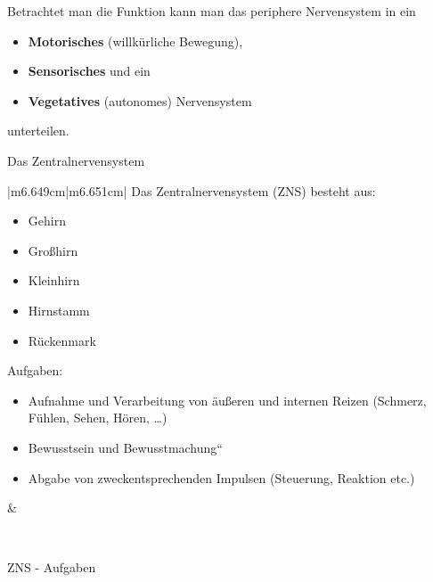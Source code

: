 \documentclass{article}
\newcommand\gEs[1]{\textbf{\textcolor[rgb]{0.0,0.0,0.5019608}{#1}}}
\newcommand\gEs[1]{\textbf{\textcolor[rgb]{0.0,0.0,0.5019608}{#1}}}
\newcommand\gNw[1]{#1}
\begin{document}
{\mdseries
Betrachtet man die Funktion kann man das periphere Nervensystem in ein }

\begin{itemize}
\item {\mdseries
\gEs{Motorisches} (willk\"urliche Bewegung),}

\item {\mdseries
\gEs{Sensorisches} und ein}

\item {\mdseries
\gEs{Vegetatives} (autonomes) Nervensystem}

\end{itemize}
{\mdseries
unterteilen. }

{\mdseries\color[rgb]{0.0,0.0,0.5019608}
Das Zentralnervensystem}

\begin{center}
\tablehead{}\begin{supertabular}{|m{6.649cm}|m{6.651cm}|}
\hline
Das Zentralnervensystem (ZNS) besteht aus:

\begin{itemize}
\item Gehirn

\end{itemize}
\begin{itemize}
\item {\mdseries Gro{\ss}hirn}

\item {\mdseries Kleinhirn}

\item {\mdseries Hirnstamm}

\end{itemize}
\begin{itemize}
\item R\"uckenmark

\end{itemize}
Aufgaben:

\begin{itemize}
\item Aufnahme  und Verarbeitung  von \"au{\ss}eren und internen  Reizen
(Schmerz, F\"uhlen, Sehen, H\"oren, {\dots})

\item \gNw{Bewusstsein und
{\quotedblbase}Bewusstmachung{\textquotedblleft}}

\item Abgabe  von zweckentsprechenden Impulsen  (Steuerung, Reaktion
etc.)

\end{itemize}
 &
{\par}

\\\hline
\end{supertabular}
\end{center}
{\mdseries\color{black}
%
%
ZNS - Aufgaben}
\end{document}
